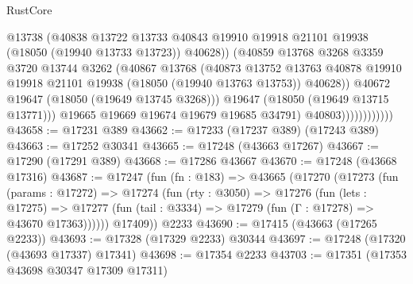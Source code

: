 \begin{lexlean}{RustCore}
\begin{coremodule}
                                  @13738
                                  (@40838
                                    @13722
                                    @13733
                                    @40843
                                    @19910
                                    @19918
                                    @21101
                                    @19938
                                    (@18050 (@19940 @13733 @13723))
                                    @40628))
                                (@40859
                                  @13768
                                  @3268
                                  @3359
                                  @3720
                                  @13744
                                  @3262
                                  (@40867
                                    @13768
                                    (@40873
                                      @13752
                                      @13763
                                      @40878
                                      @19910
                                      @19918
                                      @21101
                                      @19938
                                      (@18050 (@19940 @13763 @13753))
                                      @40628))
                                  @40672
                                  @19647
                                  (@18050 (@19649 @13745 @3268)))
                                @19647
                                (@18050 (@19649 @13715 @13771)))
                              @19665
                              @19669
                              @19674
                              @19679
                              @19685
                              @34791)
                            @40803))))))))))))
@43658 := @17231 @389
@43662 := @17233 (@17237 @389) (@17243 @389)
@43663 := @17252 @30341
@43665 := @17248 (@43663 @17267)
@43667 := @17290 (@17291 @389)
@43668 := @17286 @43667
@43670 := @17248 (@43668 @17316)
@43687 := @17247
    (fun (fn : @183) =>
    @43665
      (@17270
        (@17273
          (fun (params : @17272) =>
          @17274
            (fun (rty : @3050) =>
            @17276
              (fun (lets : @17275) =>
              @17277 (fun (tail : @3334) => @17279 (fun (Γ : @17278) => @43670 @17363))))))
        @17409))
    @2233
@43690 := @17415 (@43663 (@17265 @2233))
@43693 := @17328 (@17329 @2233) @30344
@43697 := @17248 (@17320 (@43693 @17337) @17341)
@43698 := @17354 @2233
@43703 := @17351 (@17353 @43698 @30347 @17309 @17311)

\end{coremodule}
\end{lexlean}

